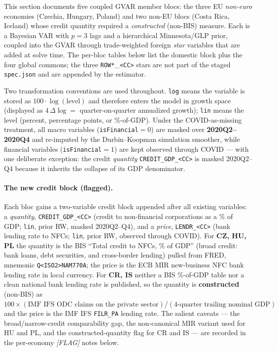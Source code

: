 This section documents five coupled GVAR member blocs: the three
EU \emph{non-euro} economies (Czechia, Hungary, Poland) and two non-EU
blocs (Costa Rica, Iceland) whose credit quantity required a
\emph{constructed} (non-BIS) measure.  Each is a Bayesian VAR with
$p=3$ lags and a hierarchical Minnesota/GLP prior, coupled into the
GVAR through trade-weighted foreign \emph{star} variables that are added
at solve time.  The per-bloc tables below list the domestic block plus
the four global commons; the three \texttt{ROW*}\_\texttt{<CC>} stars are
not part of the staged \texttt{spec.json} and are appended by the
estimator.

Two transformation conventions are used throughout.  \texttt{log} means
the variable is stored as $100\cdot\log(\text{level})$ and therefore
enters the model in growth space (displayed as $4\,\Delta\log=$
quarter-on-quarter annualized growth); \texttt{lin} means the level
(percent, percentage points, or \%-of-GDP).  Under the COVID-as-missing
treatment, all macro variables (\texttt{isFinancial}$=0$) are masked over
\textbf{2020Q2--2020Q4} and re-imputed by the Durbin--Koopman simulation
smoother, while financial variables (\texttt{isFinancial}$=1$) are kept
observed through COVID --- with one deliberate exception: the credit
\emph{quantity} \texttt{CREDIT\_GDP\_<CC>} is masked 2020Q2--Q4 because it
inherits the collapse of its GDP denominator.

\paragraph{The new credit block (flagged).}
Each bloc gains a two-variable credit block appended after all existing
variables: a \emph{quantity}, \texttt{CREDIT\_GDP\_<CC>} (credit to
non-financial corporations as a \% of GDP; \texttt{lin}, prior RW,
masked 2020Q2--Q4), and a \emph{price}, \texttt{LENDR\_<CC>} (bank
lending rate to NFCs; \texttt{lin}, prior RW, observed through COVID).
For \textbf{CZ, HU, PL} the quantity is the BIS ``Total credit to NFCs,
\% of GDP'' (broad credit: bank loans, debt securities, and cross-border
lending) pulled from FRED, mnemonic \texttt{Q<ISO2>NAM770A}; the price is
the ECB MIR new-business NFC bank lending rate in local currency.  For
\textbf{CR, IS} neither a BIS \%-of-GDP table nor a clean national bank
lending rate is published, so the quantity is \textbf{constructed}
(non-BIS) as $100\times(\text{IMF IFS ODC claims on the private
sector})/(\text{4-quarter trailing nominal GDP})$ and the price is the
IMF IFS \texttt{FILR\_PA} lending rate.  The salient caveats --- the
broad/narrow-credit comparability gap, the non-canonical MIR variant used
for HU and PL, and the constructed-quantity flag for CR and IS --- are
recorded in the per-economy \textit{[FLAG]} notes below.

